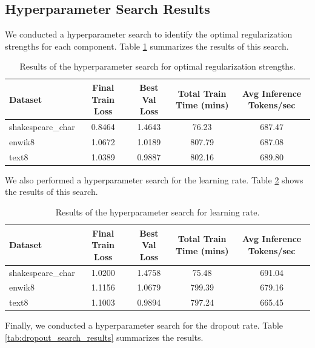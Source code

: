 \documentclass{article} %
\begin{document}
\subsection{Hyperparameter Search Results}
We conducted a hyperparameter search to identify the optimal regularization strengths for each component. Table \ref{tab:hyperparam_search_results} summarizes the results of this search.

\begin{table}[h]
    \centering
    \begin{tabular}{lcccc}
        \toprule
        Dataset & Final Train Loss & Best Val Loss & Total Train Time (mins) & Avg Inference Tokens/sec \\
        \midrule
        shakespeare\_char & 0.8464 & 1.4643 & 76.23 & 687.47 \\
        enwik8 & 1.0672 & 1.0189 & 807.79 & 687.08 \\
        text8 & 1.0389 & 0.9887 & 802.16 & 689.80 \\
        \bottomrule
    \end{tabular}
    \caption{Results of the hyperparameter search for optimal regularization strengths.}
    \label{tab:hyperparam_search_results}
\end{table}

We also performed a hyperparameter search for the learning rate. Table \ref{tab:lr_search_results} shows the results of this search.

\begin{table}[h]
    \centering
    \begin{tabular}{lcccc}
        \toprule
        Dataset & Final Train Loss & Best Val Loss & Total Train Time (mins) & Avg Inference Tokens/sec \\
        \midrule
        shakespeare\_char & 1.0200 & 1.4758 & 75.48 & 691.04 \\
        enwik8 & 1.1156 & 1.0679 & 799.39 & 679.16 \\
        text8 & 1.1003 & 0.9894 & 797.24 & 665.45 \\
        \bottomrule
    \end{tabular}
    \caption{Results of the hyperparameter search for learning rate.}
    \label{tab:lr_search_results}
\end{table}

Finally, we conducted a hyperparameter search for the dropout rate. Table \ref{tab:dropout_search_results} summarizes the results.
\end{document}

